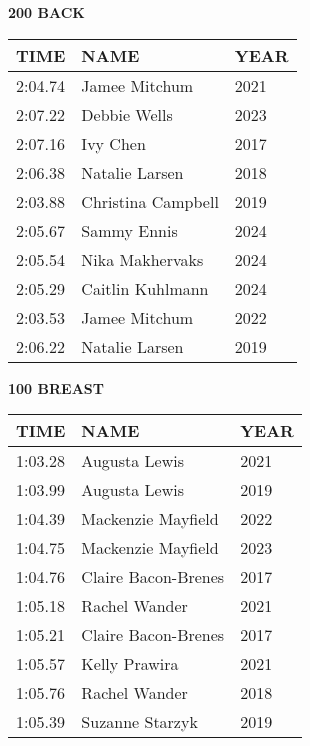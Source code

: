 \begin{minipage}[t]{0.48\textwidth}
\centering
\textbf{200 BACK}\\[0.05cm]
\begin{tabular}{@{}p{1.8cm}p{2.8cm}p{1.2cm}@{}}
\hline
\textbf{TIME} & \textbf{NAME} & \textbf{YEAR} \\
\hline
2:04.74 & Jamee Mitchum & 2021 \\
2:07.22 & Debbie Wells & 2023 \\
2:07.16 & Ivy Chen & 2017 \\
2:06.38 & Natalie Larsen & 2018 \\
2:03.88 & Christina Campbell & 2019 \\
2:05.67 & Sammy Ennis & 2024 \\
2:05.54 & Nika Makhervaks & 2024 \\
2:05.29 & Caitlin Kuhlmann & 2024 \\
2:03.53 & Jamee Mitchum & 2022 \\
2:06.22 & Natalie Larsen & 2019 \\
\hline
\end{tabular}
\end{minipage}\hfill
\begin{minipage}[t]{0.48\textwidth}
\centering
\textbf{100 BREAST}\\[0.05cm]
\begin{tabular}{@{}p{1.8cm}p{2.8cm}p{1.2cm}@{}}
\hline
\textbf{TIME} & \textbf{NAME} & \textbf{YEAR} \\
\hline
1:03.28 & Augusta Lewis & 2021 \\
1:03.99 & Augusta Lewis & 2019 \\
1:04.39 & Mackenzie Mayfield & 2022 \\
1:04.75 & Mackenzie Mayfield & 2023 \\
1:04.76 & Claire Bacon-Brenes & 2017 \\
1:05.18 & Rachel Wander & 2021 \\
1:05.21 & Claire Bacon-Brenes & 2017 \\
1:05.57 & Kelly Prawira & 2021 \\
1:05.76 & Rachel Wander & 2018 \\
1:05.39 & Suzanne Starzyk & 2019 \\
\hline
\end{tabular}
\end{minipage}

\vspace{0.4cm}

